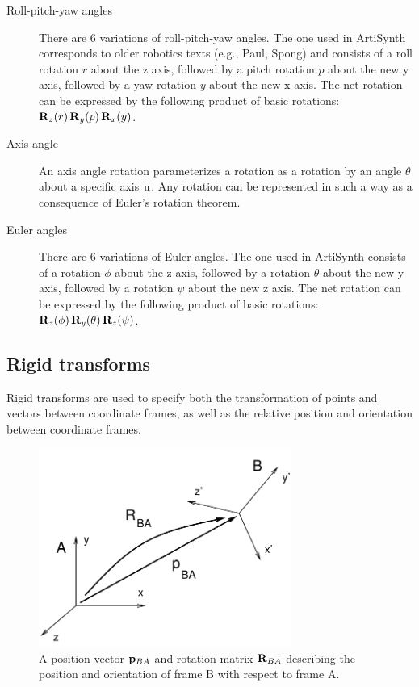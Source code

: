 \begin{description}

\item[Roll-pitch-yaw angles]\mbox{}

There are 6 variations of roll-pitch-yaw angles. The one used in
ArtiSynth corresponds to older robotics texts (e.g., Paul, Spong) and
consists of a roll rotation $r$ about the z axis, followed by a pitch
rotation $p$ about the new y axis, followed by a yaw rotation $y$
about the new x axis. The net rotation can be expressed by the
following product of basic rotations: ${\bf R}_z(r) \, {\bf R}_y(p) \, {\bf R}_x(y)$.

\item[Axis-angle]\mbox{}

An axis angle rotation parameterizes a rotation as a rotation by
an angle $\theta$ about a specific axis ${\bf u}$. Any rotation
can be represented in such a way as a consequence of Euler's rotation
theorem.

\item[Euler angles]\mbox{}

There are 6 variations of Euler angles. The one used in ArtiSynth
consists of a rotation $\phi$ about the z axis, followed by a rotation
$\theta$ about the new y axis, followed by a rotation $\psi$ about the
new z axis. The net rotation can be expressed by the following product
of basic rotations: ${\bf R}_z(\phi) \, {\bf R}_y(\theta) \, {\bf R}_z(\psi)$.

\end{description}

\subsection{Rigid transforms}
\label{RigidTransforms:sec}

Rigid transforms are used to specify both the transformation of points
and vectors between coordinate frames, as well as the relative
position and orientation between coordinate frames.

\begin{figure}[h]
\begin{center}
 \includegraphics[width=3.25in]{images/framesAB}
\end{center}
\caption{A position vector ${\bf p}_{BA}$ and rotation matrix
${\bf R}_{BA}$ describing the position and orientation of frame B
with respect to frame A.}
\label{framesAB:fig}
\end{figure}

